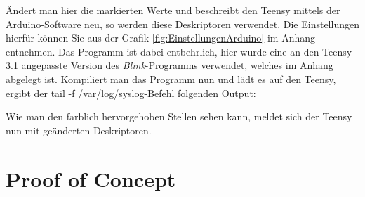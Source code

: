 \lstset{language=C}


Ändert man hier die markierten Werte und beschreibt den Teensy mittels der Arduino-Software neu, so werden diese Deskriptoren verwendet. Die Einstellungen hierfür können Sie aus der Grafik \ref{fig:EinstellungenArduino} im Anhang entnehmen. Das Programm ist dabei entbehrlich, hier wurde eine an den Teensy 3.1 angepasste Version des \textit{Blink}-Programms verwendet, welches im Anhang abgelegt ist. Kompiliert man das Programm nun und lädt es auf den Teensy, ergibt der \glqq tail -f /var/log/syslog\grqq -Befehl folgenden Output:

\lstset{language=log}


Wie man den farblich hervorgehoben Stellen sehen kann, meldet sich der Teensy nun mit geänderten Deskriptoren.

\section{Proof of Concept} \label{PoC}